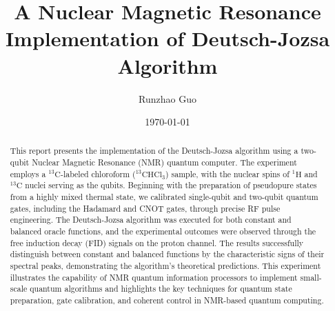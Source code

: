\documentclass[%
 reprint,
 amsmath,amssymb,
 aps,
]{revtex4-2}
\begin{document}

\title{A Nuclear Magnetic Resonance Implementation of Deutsch-Jozsa Algorithm}%

\author{Runzhao Guo}

\date{\today}%

\begin{abstract}
This report presents the implementation of the Deutsch-Jozsa algorithm using a two-qubit Nuclear Magnetic Resonance (NMR) quantum computer. The experiment employs a \(^{13}\mathrm{C}\)-labeled chloroform (\(^{13}\mathrm{CHCl}_3\)) sample, with the nuclear spins of \(^{1}\mathrm{H}\) and \(^{13}\mathrm{C}\) nuclei serving as the qubits. Beginning with the preparation of pseudopure states from a highly mixed thermal state, we calibrated single-qubit and two-qubit quantum gates, including the Hadamard and CNOT gates, through precise RF pulse engineering. The Deutsch-Jozsa algorithm was executed for both constant and balanced oracle functions, and the experimental outcomes were observed through the free induction decay (FID) signals on the proton channel. The results successfully distinguish between constant and balanced functions by the characteristic signs of their spectral peaks, demonstrating the algorithm’s theoretical predictions. This experiment illustrates the capability of NMR quantum information processors to implement small-scale quantum algorithms and highlights the key techniques for quantum state preparation, gate calibration, and coherent control in NMR-based quantum computing.

\end{abstract}

\maketitle
\end{document}
